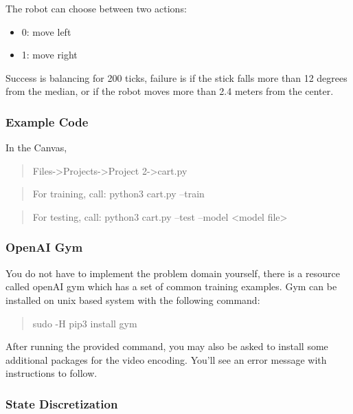 \documentclass[twoside,10pt]{article}
\begin{document}
The robot can choose between two actions:

\begin{itemize}
    \item
          0: move left
    \item
          1: move right
\end{itemize}

Success is balancing for 200 ticks, failure is if the stick falls more
than 12 degrees from the median, or if the robot moves more than 2.4
meters from the center.


\subsubsection*{Example Code}\label{example-code}

In the Canvas,

\begin{quote}
    Files-\textgreater{}Projects-\textgreater{}Project
    2-\textgreater{}cart.py
\end{quote}

\begin{quote}
    For training, call: python3 cart.py --train
\end{quote}

\begin{quote}
    For testing, call: python3 cart.py --test --model \textless{}model
    file\textgreater{}
\end{quote}


\subsubsection*{OpenAI Gym}\label{openai-gym}

You do not have to implement the problem domain yourself, there is a
resource called openAI gym which has a set of common training examples.
Gym can be installed on unix based system with the following command:

\begin{quote}
    sudo -H pip3 install gym
\end{quote}

After running the provided command, you may also be asked to install
some additional packages for the video encoding. You'll see an error
message with instructions to follow.

\subsubsection*{State Discretization}\label{state-discretization}
\end{document}
